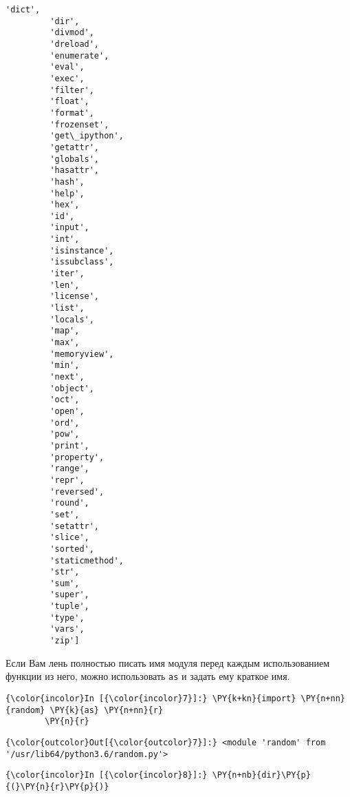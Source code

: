\begin{Verbatim}[commandchars=\\\{\}]
         'dict',
         'dir',
         'divmod',
         'dreload',
         'enumerate',
         'eval',
         'exec',
         'filter',
         'float',
         'format',
         'frozenset',
         'get\_ipython',
         'getattr',
         'globals',
         'hasattr',
         'hash',
         'help',
         'hex',
         'id',
         'input',
         'int',
         'isinstance',
         'issubclass',
         'iter',
         'len',
         'license',
         'list',
         'locals',
         'map',
         'max',
         'memoryview',
         'min',
         'next',
         'object',
         'oct',
         'open',
         'ord',
         'pow',
         'print',
         'property',
         'range',
         'repr',
         'reversed',
         'round',
         'set',
         'setattr',
         'slice',
         'sorted',
         'staticmethod',
         'str',
         'sum',
         'super',
         'tuple',
         'type',
         'vars',
         'zip']
\end{Verbatim}
        
    Если Вам лень полностью писать имя модуля перед каждым использованием
функции из него, можно использовать \texttt{as} и задать ему краткое
имя.

    \begin{Verbatim}[commandchars=\\\{\}]
{\color{incolor}In [{\color{incolor}7}]:} \PY{k+kn}{import} \PY{n+nn}{random} \PY{k}{as} \PY{n+nn}{r}
        \PY{n}{r}
\end{Verbatim}

            \begin{Verbatim}[commandchars=\\\{\}]
{\color{outcolor}Out[{\color{outcolor}7}]:} <module 'random' from '/usr/lib64/python3.6/random.py'>
\end{Verbatim}
        
    \begin{Verbatim}[commandchars=\\\{\}]
{\color{incolor}In [{\color{incolor}8}]:} \PY{n+nb}{dir}\PY{p}{(}\PY{n}{r}\PY{p}{)}
\end{Verbatim}

